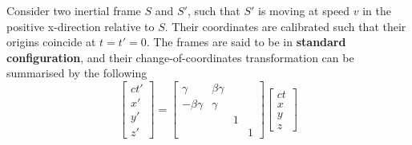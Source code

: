 Consider two inertial frame $S$ and $S'$, such that $S'$ is moving at speed $v$ in the positive x-direction relative to $S$. Their coordinates are calibrated such that their origins coincide at $t=t'=0$. The frames are said to be in \textbf{standard configuration}, and their change-of-coordinates transformation can be summarised by the following
\begin{equation}
    \begin{bmatrix}
        ct' \\
        x' \\ 
        y' \\ 
        z'
    \end{bmatrix}
    =
    \begin{bmatrix}
        \gamma & \beta \gamma &  & \\
        -\beta \gamma & \gamma &  & \\ 
         &  & 1 & \\ 
         &  &  & 1
    \end{bmatrix}
    \begin{bmatrix}
        ct\\
        x \\ 
        y \\ 
        z
    \end{bmatrix}
\end{equation}


